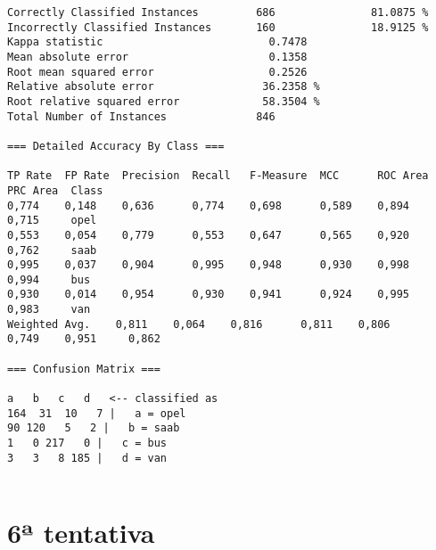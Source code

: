 \documentclass[
	article,			%
	11pt,				%
	oneside,			%
	a4paper,			%
	english,			%
	brazil,				%
	sumario=tradicional
	]{abntex2}
\begin{document}
\begin{lstlisting}
Correctly Classified Instances         686               81.0875 %
Incorrectly Classified Instances       160               18.9125 %
Kappa statistic                          0.7478
Mean absolute error                      0.1358
Root mean squared error                  0.2526
Relative absolute error                 36.2358 %
Root relative squared error             58.3504 %
Total Number of Instances              846     

=== Detailed Accuracy By Class ===

TP Rate  FP Rate  Precision  Recall   F-Measure  MCC      ROC Area  PRC Area  Class
0,774    0,148    0,636      0,774    0,698      0,589    0,894     0,715     opel
0,553    0,054    0,779      0,553    0,647      0,565    0,920     0,762     saab
0,995    0,037    0,904      0,995    0,948      0,930    0,998     0,994     bus
0,930    0,014    0,954      0,930    0,941      0,924    0,995     0,983     van
Weighted Avg.    0,811    0,064    0,816      0,811    0,806      0,749    0,951     0,862     

=== Confusion Matrix ===

a   b   c   d   <-- classified as
164  31  10   7 |   a = opel
90 120   5   2 |   b = saab
1   0 217   0 |   c = bus
3   3   8 185 |   d = van


\end{lstlisting}

\section{6ª tentativa}
\end{document}
